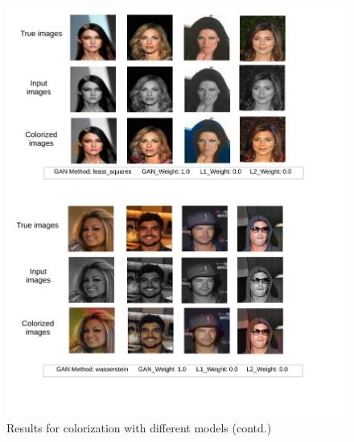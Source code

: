 \documentclass[11pt]{article}
\begin{document}
\begin{figure}[t]
\vspace{-10mm}
\hspace{-20mm}
\includegraphics [scale=0.34]{3.pdf}
\vspace{-16mm}
\caption{Results for colorization with different models (contd.)}
\label{fig:2}
\end{figure}
\end{document}
